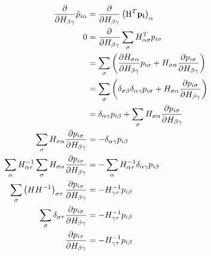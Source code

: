 \documentclass[11pt,a4paper,uplatex]{jsarticle}
\begin{document}
\begin{align}
    \frac{\partial }{\partial H_{\beta \gamma}} \tilde{ p}_{i \alpha} 
    &= \frac{\partial }{\partial H_{\beta \gamma}} \left({\rm H}^{T} \bf{p}_{i}\right)_{\alpha} \\
    0 &= \frac{\partial }{\partial H_{\beta \gamma}} \sum_{\sigma} H^{T}_{\alpha \sigma} p_{i \sigma}\\
    &= \sum_{\sigma} \left( \frac{\partial H_{\sigma \alpha} }{\partial H_{\beta \gamma}} p_{i \sigma}  +  H_{\sigma \alpha} \frac{\partial  p_{i \sigma}}{\partial H_{\beta \gamma}} \right) \\
    &= \sum_{\sigma} \left( \delta_{\sigma \beta} \delta_{\alpha \gamma} p_{i \sigma}  +  H_{\sigma \alpha} \frac{\partial  p_{i \sigma}}{\partial H_{\beta \gamma}} \right) \\
    &= \delta_{\alpha \gamma} p_{i \beta} + \sum_{\sigma} H_{\sigma \alpha} \frac{\partial  p_{i \sigma}}{\partial H_{\beta \gamma}}\\
    \sum_{\sigma} H_{\sigma \alpha} \frac{\partial  p_{i \sigma}}{\partial H_{\beta \gamma}} &= - \delta_{\alpha \gamma} p_{i \beta} 
    \\
    \sum_{\alpha} H^{-1}_{\alpha \tau} \sum_{\sigma} H_{\sigma \alpha} \frac{\partial  p_{i \sigma}}{\partial H_{\beta \gamma}} &= - \sum_{\alpha} H^{-1}_{\alpha \tau}  \delta_{\alpha \gamma} p_{i \beta}  
    \\
    \sum_{\sigma} \left( H H^{-1} \right)_{\sigma \tau}  \frac{\partial  p_{i \sigma}}{\partial H_{\beta \gamma}} &= - H^{-1}_{\gamma \tau} p_{i \beta}  \\%
    \sum_{\sigma} \delta_{\sigma \tau}  \frac{\partial  p_{i \sigma}}{\partial H_{\beta \gamma}} &= - H^{-1}_{\gamma \tau} p_{i \beta}  \\%
    \frac{\partial  p_{i \tau}}{\partial H_{\beta \gamma}} &= - H^{-1}_{\gamma \tau} p_{i \beta}  %
\end{align}
\end{document}

